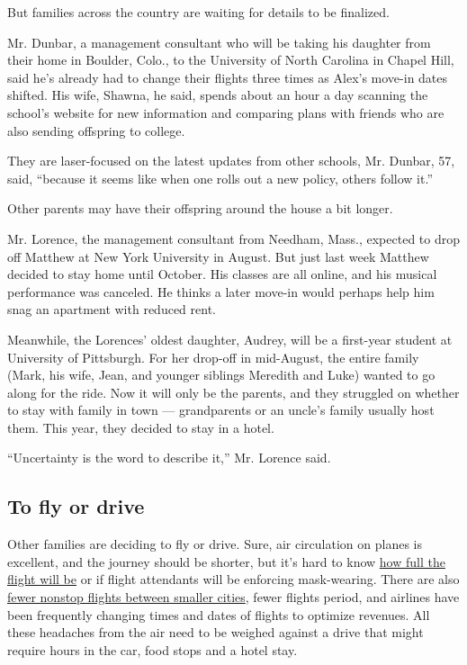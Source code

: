 But families across the country are waiting for details to be finalized.

Mr. Dunbar, a management consultant who will be taking his daughter from
their home in Boulder, Colo., to the University of North Carolina in
Chapel Hill, said he's already had to change their flights three times
as Alex's move-in dates shifted. His wife, Shawna, he said, spends about
an hour a day scanning the school's website for new information and
comparing plans with friends who are also sending offspring to college.

They are laser-focused on the latest updates from other schools, Mr.
Dunbar, 57, said, ``because it seems like when one rolls out a new
policy, others follow it.''

Other parents may have their offspring around the house a bit longer.

Mr. Lorence, the management consultant from Needham, Mass., expected to
drop off Matthew at New York University in August. But just last week
Matthew decided to stay home until October. His classes are all online,
and his musical performance was canceled. He thinks a later move-in
would perhaps help him snag an apartment with reduced rent.

Meanwhile, the Lorences' oldest daughter, Audrey, will be a first-year
student at University of Pittsburgh. For her drop-off in mid-August, the
entire family (Mark, his wife, Jean, and younger siblings Meredith and
Luke) wanted to go along for the ride. Now it will only be the parents,
and they struggled on whether to stay with family in town ---
grandparents or an uncle's family usually host them. This year, they
decided to stay in a hotel.

``Uncertainty is the word to describe it,'' Mr. Lorence said.

\hypertarget{to-fly-or-drive}{%
\subsection{To fly or drive}\label{to-fly-or-drive}}

Other families are deciding to fly or drive. Sure, air circulation on
planes is excellent, and the journey should be shorter, but it's hard to
know
\href{https://www.nytimes.com/2020/07/21/travel/crowded-flights-coronavirus.html}{how
full the flight will be} or if flight attendants will be enforcing
mask-wearing. There are also
\href{https://www.nytimes.com/2020/04/09/travel/coronavirus-regional-airports-cancellations.html}{fewer
nonstop flights between smaller cities}, fewer flights period, and
airlines have been frequently changing times and dates of flights to
optimize revenues. All these headaches from the air need to be weighed
against a drive that might require hours in the car, food stops and a
hotel stay.

